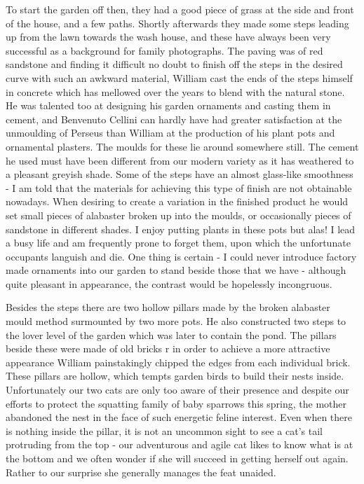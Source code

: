  

To start the garden off then, they had a good piece of grass at the side and front of the house, and a few paths. Shortly afterwards they made some steps leading up from the lawn towards the wash house, and these have always been very successful as a background for family photographs. The paving was of red sandstone and finding it difficult no doubt to finish off the steps in the desired curve	with such an awkward material, William cast the ends of the steps himself in concrete which has mellowed over the years to blend with the natural stone. He was talented too at designing his garden ornaments and casting them in cement, and Benvenuto Cellini can hardly have had greater satisfaction at the unmoulding of Perseus than William at the production of his plant pots and ornamental plasters. The moulds for these lie around somewhere still. The cement he used must have been different from our modern variety as it has weathered to a pleasant greyish shade. Some of the steps have an almost glass-like smoothness - I am told that the materials for achieving this type of finish are not obtainable nowadays. When desiring to create a variation in the finished product he would set small pieces of alabaster broken up into the moulds, or occasionally pieces of sandstone in different shades. I enjoy putting plants in these pots but alas! I lead a busy life and am frequently prone to forget them, upon which the unfortunate occupants languish and die. One thing is certain - I could never introduce factory made ornaments into our garden to stand beside those that we have - although quite pleasant in appearance, the contrast would be hopelessly incongruous.

Besides the steps there are two hollow pillars made by the broken alabaster mould method surmounted by two more pots. He also constructed two steps to the lover level of the garden which was later to contain the pond. The pillars beside these were made of old bricks r in order to achieve a more attractive appearance William painstakingly chipped the edges from each individual brick. These pillars are hollow, which tempts garden birds to build their nests inside. Unfortunately our two cats are only too aware of their presence and despite our efforts to protect the squatting family of baby sparrows this spring, the mother abandoned the nest in the face of such energetic feline interest. Even when there is nothing inside the pillar, it is not an uncommon sight to see a cat's tail protruding from the top - our adventurous and agile cat likes to know what is at the bottom and we often wonder if she will succeed in getting herself out again. Rather to our surprise she generally manages the feat unaided.

